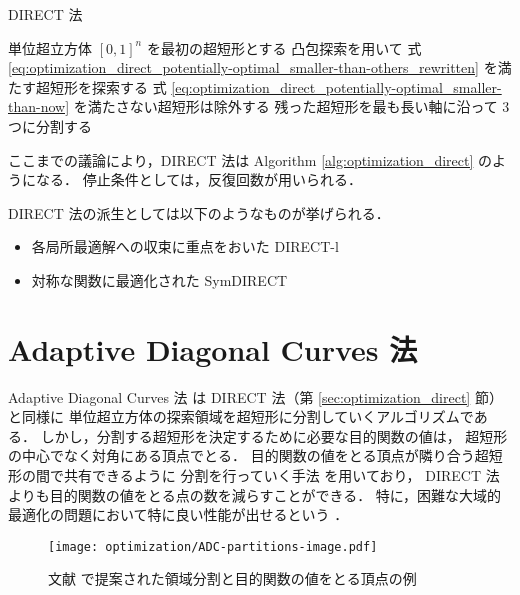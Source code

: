 \begin{algorithm}[tp]
    \caption{DIRECT 法}
    \label{alg:optimization_direct}
    \begin{algorithmic}[1]
        \State 単位超立方体 $[0, 1]^n$ を最初の超短形とする
        \Loop
        \State 凸包探索を用いて
        式 \eqref{eq:optimization_direct_potentially-optimal_smaller-than-others_rewritten}
        を満たす超短形を探索する
        \State 式 \eqref{eq:optimization_direct_potentially-optimal_smaller-than-now}
        を満たさない超短形は除外する
        \State 残った超短形を最も長い軸に沿って 3 つに分割する
        \State \Return
        \EndIf
        \EndLoop
        \EndProcedure
    \end{algorithmic}
\end{algorithm}

ここまでの議論により，DIRECT 法は
Algorithm \ref{alg:optimization_direct} のようになる．
停止条件としては，反復回数が用いられる．

DIRECT 法の派生としては以下のようなものが挙げられる．

\begin{itemize}
    \item 各局所最適解への収束に重点をおいた DIRECT-l \cite{Gablonsky2001}
    \item 対称な関数に最適化された SymDIRECT \cite{Grbic2013}
\end{itemize}

\section{Adaptive Diagonal Curves 法}\label{sec:optimization_adaptive-diagonal-curves}

Adaptive Diagonal Curves 法 \cite{Sergeyev2006} は
DIRECT 法（第 \ref{sec:optimization_direct} 節）と同様に
単位超立方体の探索領域を超短形に分割していくアルゴリズムである．
しかし，分割する超短形を決定するために必要な目的関数の値は，
超短形の中心でなく対角にある頂点でとる．
目的関数の値をとる頂点が隣り合う超短形の間で共有できるように
分割を行っていく手法 \cite{Sergeyev2000} を用いており，
DIRECT 法よりも目的関数の値をとる点の数を減らすことができる．
特に，困難な大域的最適化の問題において特に良い性能が出せるという
\cite{Sergeyev2006,Kvasov2015}．

\begin{figure}[tp]
    \centering
    \texttt{[image: optimization/ADC-partitions-image.pdf]}
    \caption{文献 \cite{Sergeyev2000} で提案された領域分割と目的関数の値をとる頂点の例}
    \label{fig:optimization_adc_partitions-image}
\end{figure}

